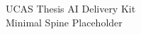 \documentclass[UTF8,a4paper,12pt]{ctexart}
\begin{document}
\thispagestyle{empty}
\begin{center}
UCAS Thesis AI Delivery Kit\\
Minimal Spine Placeholder
\end{center}
\end{document}
